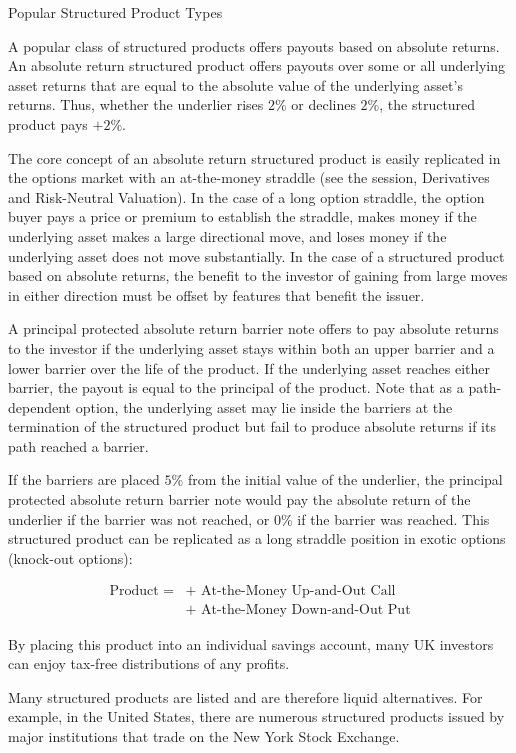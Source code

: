 \documentclass[11pt]{article}
\begin{document}
Popular Structured Product Types

A popular class of structured products offers payouts based on absolute returns. An absolute return structured product offers payouts over some or all underlying asset returns that are equal to the absolute value of the underlying asset's returns. Thus, whether the underlier rises $2 \%$ or declines $2 \%$, the structured product pays $+2 \%$.

The core concept of an absolute return structured product is easily replicated in the options market with an at-the-money straddle (see the session, Derivatives and Risk-Neutral Valuation). In the case of a long option straddle, the option buyer pays a price or premium to establish the straddle, makes money if the underlying asset makes a large directional move, and loses money if the underlying asset does not move substantially. In the case of a structured product based on absolute returns, the benefit to the investor of gaining from large moves in either direction must be offset by features that benefit the issuer.

A principal protected absolute return barrier note offers to pay absolute returns to the investor if the underlying asset stays within both an upper barrier and a lower barrier over the life of the product. If the underlying asset reaches either barrier, the payout is equal to the principal of the product. Note that as a path-dependent option, the underlying asset may lie inside the barriers at the termination of the structured product but fail to produce absolute returns if its path reached a barrier.

If the barriers are placed $5 \%$ from the initial value of the underlier, the principal protected absolute return barrier note would pay the absolute return of the underlier if the barrier was not reached, or 0\% if the barrier was reached. This structured product can be replicated as a long straddle position in exotic options (knock-out options):

$$
\begin{aligned}
\text { Product }= & + \text { At-the-Money Up-and-Out Call } \\
& + \text { At-the-Money Down-and-Out Put }
\end{aligned}
$$

By placing this product into an individual savings account, many UK investors can enjoy tax-free distributions of any profits.

Many structured products are listed and are therefore liquid alternatives. For example, in the United States, there are numerous structured products issued by major institutions that trade on the New York Stock Exchange.
\end{document}
